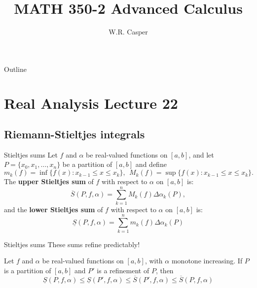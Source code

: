 \documentclass{beamer}
\title{MATH 350-2 Advanced Calculus}
\subtitle
{} %
\author[W.R. Casper] %
{W.R. Casper}
\institute[California State University Fullerton] %
{
  Department of Mathematics\\
  California State University Fullerton}
\begin{document}
\begin{frame}
  \titlepage
\end{frame}

\begin{frame}{Outline}
  \tableofcontents
\end{frame}



\section{Real Analysis Lecture 22}

\subsection{Riemann-Stieltjes integrals}

\begin{frame}{Stieltjes sums}
Let $f$ and $\alpha$ be real-valued functions on $[a,b]$, and let $P=\{x_0,x_1,\dots,x_n\}$ be a partition of $[a,b]$ and define\\
{\small
$$m_k(f) = \inf\{f(x): x_{k-1}\leq x\leq x_k\},\ \ M_k(f) = \sup\{f(x): x_{k-1}\leq x\leq x_k\}.$$
}
\pause
The \textbf{upper Stieltjes sum} of $f$ with respect to $\alpha$ on $[a,b]$ is:
$$\overline{S}(P,f,\alpha) = \sum_{k=1}^n M_k(f)\Delta\alpha_k(P),$$
\pause
and the \textbf{lower Stieltjes sum} of $f$ with respect to $\alpha$ on $[a,b]$ is:
$$\underline{S}(P,f,\alpha) = \sum_{k=1}^n m_k(f)\Delta\alpha_k(P)$$
\end{frame}

\begin{frame}{Stieltjes sums}
These sums refine predictably!
\begin{lem}
Let $f$ and $\alpha$ be real-valued functions on $[a,b]$, with $\alpha$ monotone increasing.
\pause
If $P$ is a partition of $[a,b]$ and $P'$ is a refinement of $P$, then
$$
\underline{S}(P,f,\alpha) \leq
\underline{S}(P',f,\alpha) \leq
\overline{S}(P',f,\alpha) \leq
\overline{S}(P,f,\alpha)
$$
\end{lem}
\end{frame}
\end{document}
